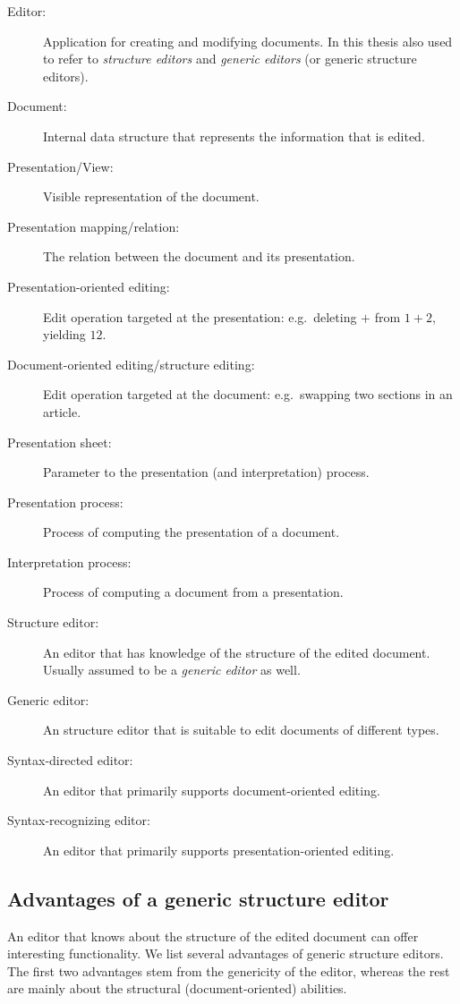 \begin{description}
\item[Editor:] Application for creating and modifying documents. In this thesis also used to refer to {\em structure editors} and {\em generic editors} (or generic structure editors).
\item[Document:] Internal data structure that represents the information that is edited.
\item[Presentation/View:] Visible representation of the document.
\item[Presentation mapping/relation:] The relation between the document and its presentation.
\item[Presentation-oriented editing:] Edit operation targeted at the presentation: e.g.\ deleting $+$ from $1+2$, yielding $12$.
\item[Document-oriented editing/structure editing:] Edit operation targeted at the document: e.g.\ swapping two sections in an article.
\item[Presentation sheet:] Parameter to the presentation (and interpretation) process. 
\item[Presentation process:] Process of computing the presentation of a document.
\item[Interpretation process:] Process of computing a document from a presentation.
\item[Structure editor:] An editor that has knowledge of the structure of the edited document. Usually assumed to be a {\em generic editor} as well.
\item[Generic editor:] An structure editor that is suitable to edit documents of different types.
\item[Syntax-directed editor:] An editor that primarily supports document-oriented editing.
\item[Syntax-recognizing editor:] An editor that primarily supports presentation-oriented editing.
\end{description} 


%								
\subsection{Advantages of a generic structure editor}

An editor that knows about the structure of the edited document can offer interesting functionality. We list several advantages of generic structure editors. The first two advantages stem from the genericity of the editor, whereas the rest are mainly about the structural (document-oriented) abilities.

